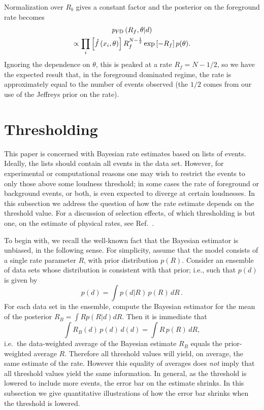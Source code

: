 \documentclass[aps,prd,reprint,nofootinbib]{revtex4-1}
\begin{document}
Normalization over $R_b$ gives a constant factor and the posterior on
the foreground rate becomes
\begin{multline}
p_{\rm FD}\left( R_f, \theta | d \right) \\ \propto \prod_{i} \left[
  \hat{f}\left(x_i, \theta\right)\right] R_f^{N-\frac{1}{2}}
\exp\left[-R_f \right] p(\theta).
\end{multline}
Ignoring the dependence on $\theta$, this is peaked at a rate $R_f =
N-1/2$, so we have the expected result that, in the foreground
dominated regime, the rate is approximately equal to the number of
events observed (the $1/2$ comes from our use of the Jeffreys prior on
the rate).  

\section{Thresholding}
This paper is concerned with Bayesian rate estimates based on lists of
events.  Ideally, the lists should contain all events in the data set.
However, for experimental or computational reasons one may wish to
restrict the events to only those above some loudness threshold; in
some cases the rate of foreground or background events, or both, is
even expected to diverge at certain loudnesses.  In this subsection we
address the question of how the rate estimate depends on the threshold
value.  For a discussion of selection effects, of which thresholding
is but one, on the estimate of physical rates, see
Ref.~\cite{Messenger2012}.

To begin with, we recall the well-known fact that the Bayesian
estimator is unbiased, in the following sense.  For simplicity, assume
that the model consists of a single rate parameter $R$, with prior
distribution $p(R)$.  Consider an ensemble of data sets whose
distribution is consistent with that prior; i.e., such that $p(d)$ is
given by
\begin{equation}
 p(d) = \int{ p(d|R)\,p(R)\, dR}\, .  
\end{equation}
For each data set in the ensemble, compute the Bayesian estimator 
for the mean of the posterior $R_{B} = \int{ R p(R|d) dR}$.  Then it is immediate that
\begin{equation}
\int{R_{B}(d)\, p(d)\,d(d) }= \int{ R\, p(R) \,dR},
\end{equation}
i.e.\ the data-weighted average of the Bayesian estimate $R_{B}$
equals the prior-weighted average $R$.  Therefore all threshold values
will yield, on average, the same estimate of the rate.  However this
equality of averages does {\it not} imply that all threshold values
yield the same information. In general, as the threshold is lowered to
include more events, the error bar on the estimate shrinks.  In this
subsection we give quantitative illustrations of how the error bar
shrinks when the threshold is lowered.
\end{document}
